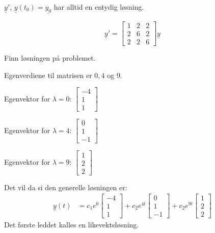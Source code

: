 \documentclass[11pt, a4paper, norsk]{article}
\begin{document}
            \begin{Theorem}{}{}
                $\underline{y}'$, $\underline{y}(t_0) = \underline{y_0}$ har alltid en entydig løsning.
            \end{Theorem}
            \begin{Example}{}{}
                $$\underline{y}' = \begin{bmatrix}
                    1 & 2 & 2 \\
                    2 & 6 & 2 \\
                    2 & 2 & 6
                \end{bmatrix}\underline{y}$$

                Finn løsningen på problemet.

                Egenverdiene til matrisen er $0, 4$ og $9$. 

                Egenvektor for $\lambda = 0$: $\begin{bmatrix}
                    -4 \\
                    1 \\
                    1
                \end{bmatrix}$

                Egenvektor for $\lambda = 4$: $\begin{bmatrix}
                    0 \\
                    1 \\
                    -1
                \end{bmatrix}$

                Egenvektor for $\lambda = 9$: $\begin{bmatrix}
                    1 \\
                    2 \\
                    2
                \end{bmatrix}$

                Det vil da si den generelle løsningen er:
                \begin{align*}
                    \underline{y}(t) &= c_1e^{0}\begin{bmatrix}
                       -4 \\
                       1 \\
                       1
                   \end{bmatrix} + c_2e^{4t}\begin{bmatrix}
                       0 \\
                       1 \\
                       -1
                   \end{bmatrix} + c_2e^{9t}\begin{bmatrix}
                       1 \\
                       2 \\
                       2
                   \end{bmatrix}
                \end{align*}
                Det første leddet kalles en likevektsløsning.
            \end{Example}
\end{document}
